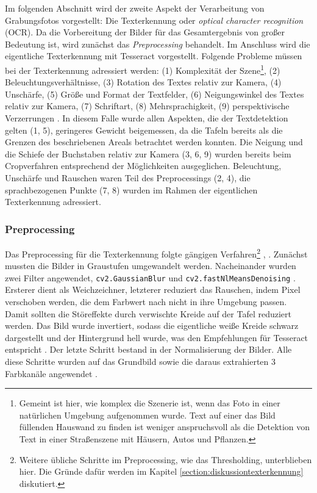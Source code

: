Im folgenden Abschnitt wird der zweite Aspekt der Verarbeitung von Grabungsfotos vorgestellt: Die Texterkennung oder \textit{optical character recognition} (OCR). Da die Vorbereitung der Bilder für das Gesamtergebnis von großer Bedeutung ist, wird zunächst das \textit{Preprocessing} behandelt. Im Anschluss wird die eigentliche Texterkennung mit Tesseract vorgestellt.
Folgende Probleme müssen bei der Texterkennung adressiert werden: (1) Komplexität der Szene\footnote{Gemeint ist hier, wie komplex die Szenerie ist, wenn das Foto in einer natürlichen Umgebung aufgenommen wurde. Text auf einer das Bild füllenden Hauswand zu finden ist weniger anspruchsvoll als die Detektion von Text in einer Straßenszene mit Häusern, Autos und Pflanzen.}, (2) Beleuchtungsverhältnisse, (3) Rotation des Textes relativ zur Kamera, (4) Unschärfe, (5) Größe und Format der Textfelder, (6) Neigungswinkel des Textes relativ zur Kamera, (7) Schriftart, (8) Mehrsprachigkeit, (9) perspektivische Verzerrungen \cite{hamad}. In diesem Falle wurde allen Aspekten, die der Textdetektion gelten (1, 5), geringeres Gewicht beigemessen, da die Tafeln bereits als die Grenzen des beschriebenen Areals betrachtet werden konnten. Die Neigung und die Schiefe der Buchstaben relativ zur Kamera (3, 6, 9) wurden bereits beim Cropverfahren entsprechend der Möglichkeiten ausgeglichen. Beleuchtung, Unschärfe und Rauschen waren Teil des Preprocessings (2, 4), die sprachbezogenen Punkte (7, 8) wurden im Rahmen der eigentlichen Texterkennung adressiert.

\subsubsection{Preprocessing}

Das Preprocessing für die Texterkennung folgte gängigen Verfahren\footnote{Weitere übliche Schritte im Preprocessing, wie das Thresholding, unterblieben hier. Die Gründe dafür werden im Kapitel \ref{section:diskussiontexterkennung} diskutiert.} \cite{jenilshah}, \cite{sumedhahallale}. Zunächst mussten die Bilder in Graustufen umgewandelt werden. Nacheinander wurden zwei Filter angewendet, \verb|cv2.GaussianBlur| \cite{opencvfilter} und \verb|cv2.fastNlMeansDenoising| \cite{opencvdenoise}. Ersterer dient als Weichzeichner, letzterer reduziert das Rauschen, indem Pixel verschoben werden, die dem Farbwert nach nicht in ihre Umgebung passen. Damit sollten die Störeffekte durch verwischte Kreide auf der Tafel reduziert werden. Das Bild wurde invertiert, sodass die eigentliche weiße Kreide schwarz dargestellt und der Hintergrund hell wurde, was den Empfehlungen für Tesseract entspricht \cite{tesseractoptimum}. Der letzte Schritt bestand in der Normalisierung der Bilder. Alle diese Schritte wurden auf das Grundbild sowie die daraus extrahierten 3 Farbkanäle angewendet \cite{xilinchen}.

